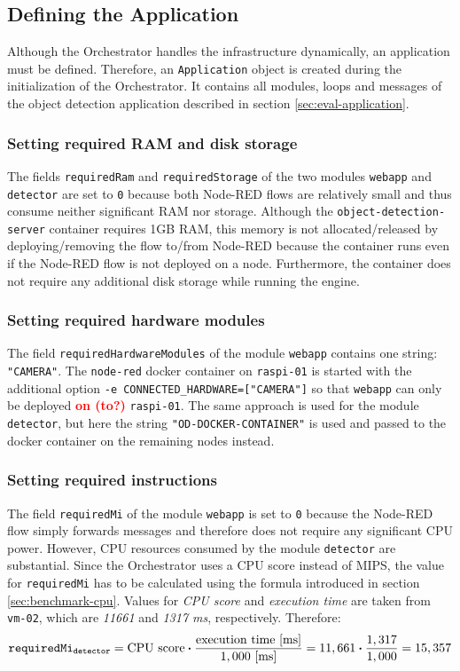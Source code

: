 \subsection{Defining the Application\label{sec:eval-defining-application}}

Although the Orchestrator handles the infrastructure dynamically, an application must be defined. 
Therefore, an \texttt{Application} object is created during the initialization of the Orchestrator.
It contains all modules, loops and messages of the object detection application described in section \ref{sec:eval-application}.

\subsubsection*{Setting required RAM and disk storage}
The fields \texttt{requiredRam} and \texttt{requiredStorage} of the two modules \texttt{webapp} and \texttt{detector} are set to \texttt{0} because both Node-RED flows are relatively small and thus consume neither significant RAM nor storage.
Although the \texttt{object-detection-server} container requires 1GB RAM, this memory is not allocated/released by deploying/removing the flow to/from Node-RED because the container runs even if the Node-RED flow is not deployed on a node.
Furthermore, the container does not require any additional disk storage while running the engine.

\subsubsection*{Setting required hardware modules}
The field \texttt{requiredHardwareModules} of the module \texttt{webapp} contains one string: \texttt{"CAMERA"}.
The \texttt{node-red} docker container on \texttt{raspi-01} is started with the additional option \texttt{-e CONNECTED\_HARDWARE=["CAMERA"]} so that \texttt{webapp} can only be deployed \textcolor{red}{\textbf{on (to?)}} \texttt{raspi-01}. The same approach is used for the module \texttt{detector}, but here the string \texttt{"OD-DOCKER-CONTAINER"} is used and passed to the docker container on the remaining nodes instead.

\subsubsection*{Setting required instructions}
The field \texttt{requiredMi} of the module \texttt{webapp} is set to \texttt{0} because the Node-RED flow simply forwards messages and therefore does not require any significant CPU power.
However, CPU resources consumed by the module \texttt{detector} are substantial.
Since the Orchestrator uses a CPU score instead of MIPS, the value for \texttt{requiredMi} has to be calculated using the formula introduced in section \ref{sec:benchmark-cpu}.
Values for \textit{CPU score} and \textit{execution time} are taken from \texttt{vm-02}, which are \textit{11661} and \textit{1317 ms}, respectively.
Therefore:
\[\textrm{\texttt{requiredMi\textsubscript{detector}}} = \textrm{CPU score} \boldsymbol{\cdot} \frac{\textrm{execution time [ms]}}{1,000 \textrm{ [ms]}} = 11,661 \boldsymbol{\cdot} \frac{1,317}{1,000} = 15,357\]

